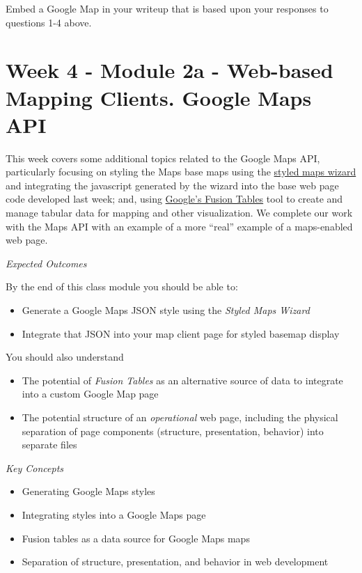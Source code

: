 \documentclass[]{book}
\providecommand{\tightlist}{%
  \setlength{\itemsep}{0pt}\setlength{\parskip}{0pt}}
\begin{document}
\begin{description}
\tightlist
\item[Question 5]
Embed a Google Map in your writeup that is based upon your responses to
questions 1-4 above.
\end{description}

\chapter{Week 4 - Module 2a - Web-based Mapping Clients. Google Maps
API}\label{week04}

This week covers some additional topics related to the Google Maps API,
particularly focusing on styling the Maps base maps using the
\href{http://gmaps-samples-v3.googlecode.com/svn/trunk/styledmaps/wizard/index.html}{styled
maps wizard} and integrating the javascript generated by the wizard into
the base web page code developed last week; and, using
\href{http://www.google.com/fusiontables/public/tour/index.html}{Google's
Fusion Tables} tool to create and manage tabular data for mapping and
other visualization. We complete our work with the Maps API with an
example of a more ``real'' example of a maps-enabled web page.

\emph{Expected Outcomes}

By the end of this class module you should be able to:

\begin{itemize}
\item
  Generate a Google Maps JSON style using the \emph{Styled Maps Wizard}
\item
  Integrate that JSON into your map client page for styled basemap
  display
\end{itemize}

You should also understand

\begin{itemize}
\item
  The potential of \emph{Fusion Tables} as an alternative source of data
  to integrate into a custom Google Map page
\item
  The potential structure of an \emph{operational} web page, including
  the physical separation of page components (structure, presentation,
  behavior) into separate files
\end{itemize}

\emph{Key Concepts}

\begin{itemize}
\item
  Generating Google Maps styles
\item
  Integrating styles into a Google Maps page
\item
  Fusion tables as a data source for Google Maps maps
\item
  Separation of structure, presentation, and behavior in web development
\end{itemize}
\end{document}
